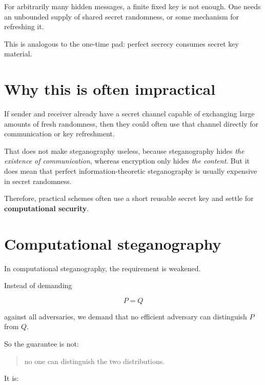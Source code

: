\documentclass[11pt]{article}
\begin{document}
For arbitrarily many hidden messages, a finite fixed key is not enough. One needs an unbounded supply of shared secret randomness, or some mechanism for refreshing it.

\begin{remark}
\label{rem:one-time-pad}
This is analogous to the one-time pad: perfect secrecy consumes secret key material.
\end{remark}

\section{Why this is often impractical}

If sender and receiver already have a secret channel capable of exchanging large amounts of fresh randomness, then they could often use that channel directly for communication or key refreshment.

\begin{remark}
\label{rem:existence-vs-content}
That does not make steganography useless, because steganography hides \emph{the existence of communication}, whereas encryption only hides \emph{the content}. But it does mean that perfect information-theoretic steganography is usually expensive in secret randomness.
\end{remark}

Therefore, practical schemes often use a short reusable secret key and settle for \textbf{computational security}.

\section{Computational steganography}

\begin{definition}
\label{def:computational-steganography}
In computational steganography, the requirement is weakened.

Instead of demanding

\[
P=Q
\]

against all adversaries, we demand that no efficient adversary can distinguish $P$ from $Q$.
\end{definition}

So the guarantee is not:

\begin{quote}
no one can distinguish the two distributions.
\end{quote}

It is:
\end{document}
